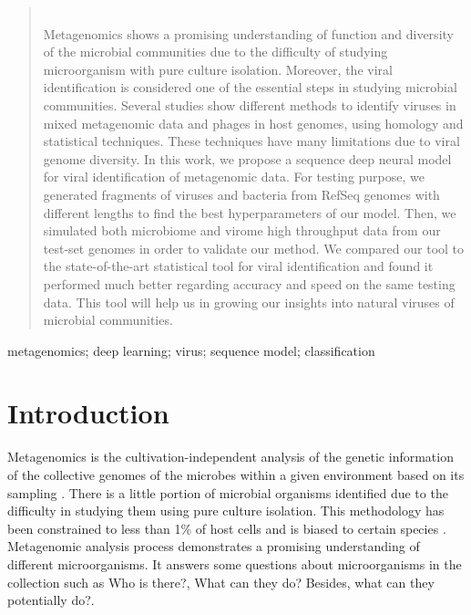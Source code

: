 \documentclass[conference]{IEEEtran}
\begin{document}
\begin{abstract}\\Metagenomics shows a promising understanding of function and diversity of the microbial communities due to the difficulty of studying microorganism with pure culture isolation. Moreover, the viral identification is considered one of the essential steps in studying microbial communities. Several studies show different methods to identify viruses in mixed metagenomic data and phages in host genomes, using homology and statistical techniques. These techniques have many limitations due to viral genome diversity. In this work, we propose a sequence deep neural model for viral identification of metagenomic data. For testing purpose, we generated fragments of viruses and bacteria from RefSeq genomes with different lengths to find the best hyperparameters of our model. Then, we simulated both microbiome and virome high throughput data from our test-set genomes in order to validate our method. %
We compared our tool to the state-of-the-art statistical tool for viral identification and found it performed much better regarding accuracy and speed on the same testing data. This tool will help us in growing our insights into natural viruses of microbial communities.
\end{abstract}
\begin{IEEEkeywords}
metagenomics; deep learning; virus; sequence model; classification 
\end{IEEEkeywords}


\section{Introduction}

Metagenomics is the cultivation-independent analysis of the genetic information of the collective genomes of the microbes within a given environment based on its sampling \cite{izard2014metagenomics}. There is a little portion of microbial organisms identified due to the difficulty in studying them using pure culture isolation. This methodology has been constrained to less than 1\% of host cells and is biased to certain species \cite{labonte2015single}.
Metagenomic analysis process demonstrates a promising understanding of different microorganisms. It answers some questions about microorganisms in the collection such as Who is there?, What can they do? Besides, what can they potentially do?.
\end{document}
